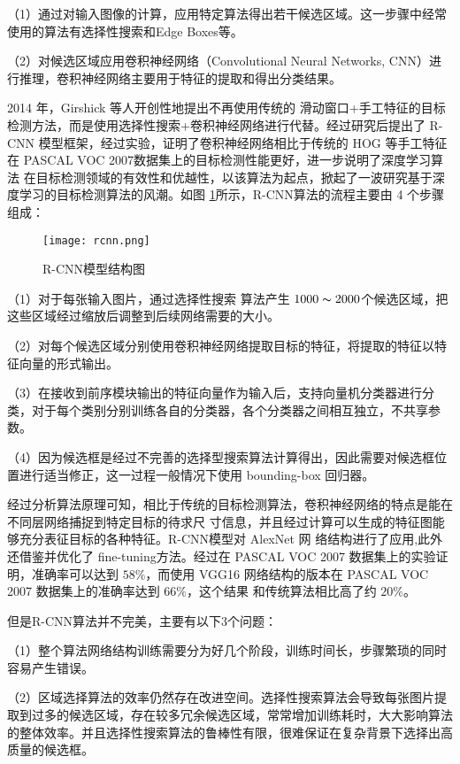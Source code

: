 （1）通过对输入图像的计算，应用特定算法得出若干候选区域。这一步骤中经常使用的算法有选择性搜索和Edge Boxes等。

（2）对候选区域应用卷积神经网络（Convolutional Neural Networks, CNN）进行推理，卷积神经网络主要用于特征的提取和得出分类结果。

2014 年，Girshick 等人开创性地提出不再使用传统的
滑动窗口+手工特征的目标检测方法，而是使用选择性搜索+卷积神经网络进行代替。经过研究后提出了 R-CNN 模型框架\cite{girshick2014rich}，经过实验，证明了卷积神经网络相比于传统的 HOG
等手工特征在 PASCAL VOC 2007数据集上的目标检测性能更好，进一步说明了深度学习算法
在目标检测领域的有效性和优越性，以该算法为起点，掀起了一波研究基于深度学习的目标检测算法的风潮。如图
\ref{rcnn}所示，R-CNN算法的流程主要由 4 个步骤组成：

\begin{figure}[htbp]
    \centering
    \texttt{[image: rcnn.png]}
    \caption{R-CNN模型结构图\cite{girshick2014rich}}
    \label{rcnn}
\end{figure}

（1）对于每张输入图片，通过选择性搜索
算法产生 $1000\thicksim2000$个候选区域，把这些区域经过缩放后调整到后续网络需要的大小。

（2）对每个候选区域分别使用卷积神经网络提取目标的特征，将提取的特征以特征向量的形式输出。

（3）在接收到前序模块输出的特征向量作为输入后，支持向量机分类器进行分类，对于每个类别分别训练各自的分类器，各个分类器之间相互独立，不共享参数。

（4）因为候选框是经过不完善的选择型搜索算法计算得出，因此需要对候选框位置进行适当修正，这一过程一般情况下使用 bounding-box 回归器。

经过分析算法原理可知，相比于传统的目标检测算法，卷积神经网络的特点是能在不同层网络捕捉到特定目标的待求尺
寸信息，并且经过计算可以生成的特征图能够充分表征目标的各种特征。R-CNN模型对 AlexNet 网
络结构进行了应用,此外还借鉴并优化了 fine-tuning方法。经过在 PASCAL VOC 2007 数据集上的实验证明，准确率可以达到 $58\%$，而使用 VGG16 网络结构的版本在 PASCAL VOC 2007 数据集上的准确率达到 $66\%$，这个结果
和传统算法相比高了约 $20\%$。

但是R-CNN算法并不完美，主要有以下3个问题：

（1）整个算法网络结构训练需要分为好几个阶段，训练时间长，步骤繁琐的同时容易产生错误。

（2）区域选择算法的效率仍然存在改进空间。选择性搜索算法会导致每张图片提取到过多的候选区域，存在较多冗余候选区域，常常增加训练耗时，大大影响算法的整体效率。并且选择性搜索算法的鲁棒性有限，很难保证在复杂背景下选择出高质量的候选框。

